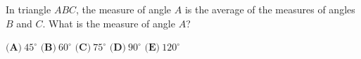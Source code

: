 In triangle $ABC$, the measure of angle $A$ is the average of the measures of angles $B$ and $C$. What is the measure of angle $A$?

$\textbf{(A)}\ $$45^\circ$ \qquad $\textbf{(B)}\ $$60^\circ$ \qquad $\textbf{(C)}\ $$75^\circ$ \qquad $\textbf{(D)}\ $$90^\circ$ \qquad $\textbf{(E)}\ $$120^\circ$
